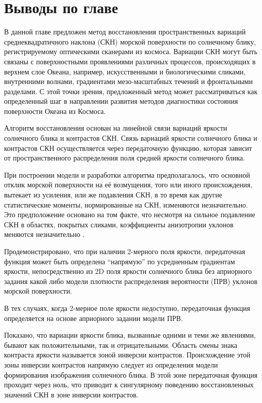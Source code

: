 \newpage



\section{Выводы по главе}

В данной главе предложен метод восстановления пространственных вариаций среднеквадратичного наклона (СКН) морской поверхности по солнечному блику, регистрируемому оптическими сканерами из космоса. Вариации СКН могут быть связаны с поверхностными проявлениями различных процессов, происходящих в верхнем слое Океана, например, искусственными и биологическими сликами, внутренними волнами, градиентами мезо-масштабных течений и фронтальными разделами. С этой точки зрения, предложенный метод может рассматриваться как определенный шаг в направлении развития методов диагностики состояния поверхности Океана из Космоса.

Алгоритм восстановления основан на линейной связи вариаций яркости солнечного блика и контрастов СКН. Связь вариаций яркости солнечного блика и контрастов СКН осуществляется через передаточную функцию, которая зависит от пространственного распределения поля средней яркости солнечного блика.

При построении модели и разработки алгоритма предполагалось, что основной отклик морской поверхности на её возмущения, того или иного происхождения, вытекает из усиления, или же подавления СКН, в то время как другие статистические моменты, нормированные на СКН, изменяются незначительно. Это предположение основано на том факте, что несмотря на сильное подавление СКН в областях, покрытых сликами, коэффициенты анизотропии уклонов меняются незначительно \citep{Cox1956}.

Продемонстрировано, что при наличии 2-мерного поля яркости, передаточная функция может быть определена ``напрямую'' по усредненным градиентам яркости, непосредственно из 2D поля яркости солнечного блика без априорного задания какой либо модели плотности распределения вероятности (ПРВ) уклонов морской поверхности.

В тех случаях, когда 2-мерное поле яркости недоступно, передаточная функция определяется на основе априорного задании модели ПРВ.

Показано, что вариации яркости блика, вызванные одними и теми же явлениями, бывают как положительными, так и отрицательными. Область смены знака контраста яркости называется зоной инверсии контрастов. Происхождение этой зоны инверсии контрастов напрямую следует из определения модели формирования изображения солнечного блика. В этой зоне передаточная функция проходит через ноль, что приводит к сингулярному поведению восстановленных значений СКН в зоне инверсии контрастов.

